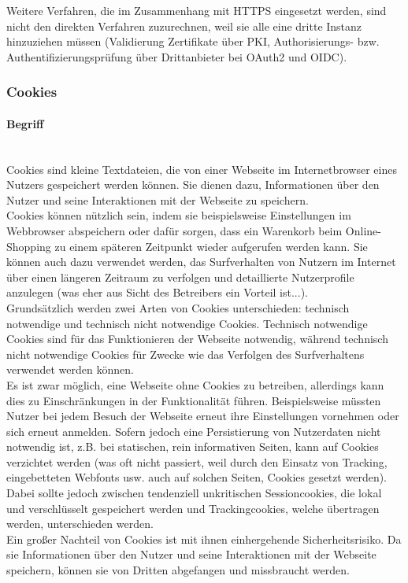 \documentclass[notitlepage, hidelinks]{article}
\begin{document}
Weitere Verfahren, die im Zusammenhang mit HTTPS eingesetzt werden, sind nicht den direkten Verfahren zuzurechnen, weil sie alle eine dritte Instanz hinzuziehen müssen (Validierung Zertifikate über PKI, Authorisierungs- bzw. Authentifizierungsprüfung über Drittanbieter bei OAuth2 und OIDC).

\subsubsection{Cookies}
\paragraph{Begriff} \mbox{} \\
Cookies sind kleine Textdateien, die von einer Webseite im Internetbrowser eines Nutzers gespeichert werden können. Sie dienen dazu, Informationen über den Nutzer und seine Interaktionen mit der Webseite zu speichern. \\
Cookies können nützlich sein, indem sie beispielsweise Einstellungen im Webbrowser abspeichern oder dafür sorgen, dass ein Warenkorb beim Online-Shopping zu einem späteren Zeitpunkt wieder aufgerufen werden kann. Sie können auch dazu verwendet werden, das Surfverhalten von Nutzern im Internet über einen längeren Zeitraum zu verfolgen und detaillierte Nutzerprofile anzulegen (was eher aus Sicht des Betreibers ein Vorteil ist...). \\
Grundsätzlich werden zwei Arten von Cookies unterschieden: technisch notwendige und technisch nicht notwendige Cookies. Technisch notwendige Cookies sind für das Funktionieren der Webseite notwendig, während technisch nicht notwendige Cookies für Zwecke wie das Verfolgen des Surfverhaltens verwendet werden können. \\
Es ist zwar möglich, eine Webseite ohne Cookies zu betreiben, allerdings kann dies zu Einschränkungen in der Funktionalität führen. Beispielsweise müssten Nutzer bei jedem Besuch der Webseite erneut ihre Einstellungen vornehmen oder sich erneut anmelden. Sofern jedoch eine Persistierung von Nutzerdaten nicht notwendig ist, z.B. bei statischen, rein informativen Seiten, kann auf Cookies verzichtet werden (was oft nicht passiert, weil durch den Einsatz von Tracking, eingebetteten Webfonts usw. auch auf solchen Seiten, Cookies gesetzt werden). Dabei sollte jedoch zwischen tendenziell unkritischen Sessioncookies, die lokal und verschlüsselt gespeichert werden und Trackingcookies, welche übertragen werden, unterschieden werden.   \\  
Ein großer Nachteil von Cookies ist mit ihnen einhergehende Sicherheitsrisiko. Da sie Informationen über den Nutzer und seine Interaktionen mit der Webseite speichern, können sie von Dritten abgefangen und missbraucht werden.
\end{document}
